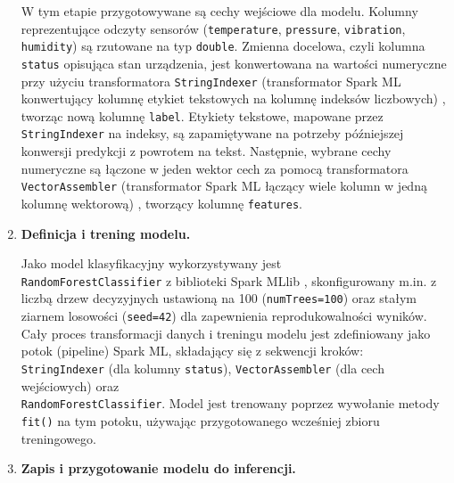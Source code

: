 \begin{enumerate}
W tym etapie przygotowywane są cechy wejściowe dla modelu. Kolumny reprezentujące odczyty sensorów (\texttt{temperature}, \texttt{pressure}, \texttt{vibration}, \texttt{humidity}) są rzutowane na typ \texttt{double}. Zmienna docelowa, czyli kolumna \texttt{status} opisująca stan urządzenia, jest konwertowana na wartości numeryczne przy użyciu transformatora \texttt{StringIndexer} (transformator Spark ML konwertujący kolumnę etykiet tekstowych na kolumnę indeksów liczbowych) \cite{spark_string_indexer}, tworząc nową kolumnę \texttt{label}. Etykiety tekstowe, mapowane przez \texttt{StringIndexer} na indeksy, są zapamiętywane na potrzeby późniejszej konwersji predykcji z powrotem na tekst. Następnie, wybrane cechy numeryczne są łączone w jeden wektor cech za pomocą transformatora \texttt{VectorAssembler} (transformator Spark ML łączący wiele kolumn w jedną kolumnę wektorową) \cite{spark_vector_assember} , tworzący kolumnę \texttt{features}.

    \item \textbf{Definicja i trening modelu.}

Jako model klasyfikacyjny wykorzystywany jest \\ \texttt{RandomForestClassifier} z biblioteki Spark MLlib \cite{spark_mllib_reference}, skonfigurowany m.in. z liczbą drzew decyzyjnych ustawioną na 100 (\texttt{numTrees=100}) oraz stałym ziarnem losowości (\texttt{seed=42}) dla zapewnienia reprodukowalności wyników. Cały proces transformacji danych i treningu modelu jest zdefiniowany jako potok (pipeline) Spark ML, składający się z sekwencji kroków: \texttt{StringIndexer} (dla kolumny \texttt{status}), \texttt{VectorAssembler} (dla cech wejściowych) oraz \\ \texttt{RandomForestClassifier}. Model jest trenowany poprzez wywołanie metody \texttt{fit()} na tym potoku, używając przygotowanego wcześniej zbioru treningowego.

    \item \textbf{Zapis i przygotowanie modelu do inferencji.}


\end{enumerate}
